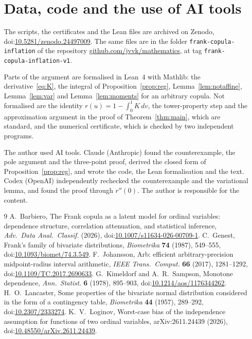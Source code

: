 \documentclass[11pt]{amsart}
\newcommand{\doi}[1]{doi:\href{https://doi.org/#1}{#1}}
\theoremstyle{definition}
\begin{document}
\section{Data, code and the use of AI tools}\label{sec:data}
\sloppy

The scripts, the certificates and the Lean files are archived on Zenodo, \doi{10.5281/zenodo.24497009}. The same
files are in the folder \texttt{frank-copula-inflation} of the repository
\href{https://github.com/jvvk/mathematics}{github.com/jvvk/mathematics}, at tag \texttt{frank-copula-inflation-v1}.

Parts of the argument are formalised in Lean~4 with Mathlib: the derivative~\eqref{eq:K}, the integral of
Proposition~\ref{prop:reg}, Lemma~\ref{lem:notaffine}, Lemma~\ref{lem:var} and Lemma~\ref{lem:moments} for an
arbitrary copula. Not formalised are the identity $r(u)=1-\int_0^1K\,dv$, the tower-property step and the
approximation argument in the proof of Theorem~\ref{thm:main}, which are standard, and the numerical certificate,
which is checked by two independent programs.

The author used AI tools. Claude (Anthropic) found the counterexample, the pole argument and the three-point proof,
derived the closed form of Proposition~\ref{prop:reg}, and wrote the code, the Lean formalisation and the text. Codex (OpenAI) independently rechecked the
counterexample and the variational lemma, and found the proof through $r''(0)$. The author is responsible for the
content.

\begin{thebibliography}{9}
 A.~Barbiero, The Frank copula as a latent model for ordinal variables: dependence structure,
correlation attenuation, and statistical inference, \emph{Adv.\ Data Anal.\ Classif.} (2026),
\doi{10.1007/s11634-026-00709-1}.
 C.~Genest, Frank's family of bivariate distributions, \emph{Biometrika} \textbf{74} (1987),
549--555, \doi{10.1093/biomet/74.3.549}.
 F.~Johansson, Arb: efficient arbitrary-precision midpoint-radius interval arithmetic, \emph{IEEE
Trans.\ Comput.} \textbf{66} (2017), 1281--1292, \doi{10.1109/TC.2017.2690633}.
 G.~Kimeldorf and A.~R.~Sampson, Monotone dependence, \emph{Ann.\ Statist.} \textbf{6} (1978),
895--903, \doi{10.1214/aos/1176344262}.
 H.~O.~Lancaster, Some properties of the bivariate normal distribution considered in the form of
a contingency table, \emph{Biometrika} \textbf{44} (1957), 289--292, \doi{10.2307/2333274}.
 K.~V.~Loginov, Worst-case bias of the independence assumption for functions of two ordinal
variables, arXiv:2611.24439 (2026), \doi{10.48550/arXiv.2611.24439}.
\end{thebibliography}
\end{document}
